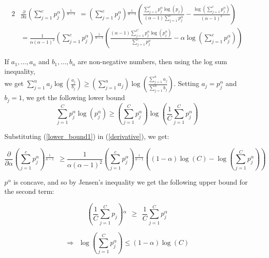 \documentclass[times,sort&compress]{elsarticle}
\begin{document}
\begin{alignat}{2} & \frac{\partial }{\partial \alpha} \left(\sum _{j=1}^c
p_j^{\alpha}\right){}^{\frac{1}{\alpha -1}}\ \ = \left(\sum _{j=1}^c
p_j^{\alpha}\right){}^{\frac{1}{\alpha -1}} \left(\frac{\sum _{j=1}^c p_j^{\alpha } \log
\left(p_j\right)}{(\alpha -1) \sum _{j=1}^c p_j^{\alpha}}-\frac{\log \left(\sum _{j=1}^c
p_j^{\alpha}\right)}{(\alpha -1)^2}\right) \\
& = \frac{1}{\alpha  (\alpha -1)^2} \left(\sum _{j=1}^c p_j^{\alpha
}\right){}^{\frac{1}{\alpha -1}} \left(\frac{(\alpha -1) \sum _{j=1}^C p_j^{\alpha }
\log \left(p_j^{\alpha}\right)}{\sum _{j=1}^c p_j^{\alpha }}-\alpha \log \left(\sum
_{j=1}^c p_j^{\alpha }\right)\right) \label{derivative} \end{alignat}

If $a_1,\dots ,a_n$ and $b_1,\dots ,b_n$ are non-negative numbers, then using the log
sum inequality, \\ we get $\sum _{j=1}^n a_j \log \left(\frac{a_j}{b_j}\right)\geq
\left(\sum _{j=1}^n a_j\right) \log \left(\frac{\sum _{j=1}^n a_j}{\sum _{j=1}^n
b_j}\right)$. Setting $a_j=p_j^\alpha$ and $b_j=1$, we get the following lower bound
\begin{equation} \sum _{j=1}^C p_j^{\alpha } \log
\left(p_j^{\alpha }\right)\geq \left(\sum _{j=1}^C
p_j^{\alpha}\right) \log \left(\frac{1}{C} \sum _{j=1}^C
p_j^{\alpha}\right) \label{lower_bound1} \end{equation}

Substituting (\ref{lower_bound1}) in (\ref{derivative}), we get:

\begin{equation} \frac{\partial }{\partial \alpha} \left(\sum
_{j=1}^c p_j^{\alpha}\right){}^{\frac{1}{\alpha -1}}\ \ \geq
\frac{1}{\alpha  (\alpha -1)^2} \left(\sum _{j=1}^c
p_j^{\alpha}\right){}^{\frac{1}{\alpha -1}} \left((1-\alpha )
\log (C)-\log \left(\sum _{j=1}^C p_j^{\alpha }\right)\right)
\label{lb_subs} \end{equation}

$p^{\alpha}$ is concave, and so by Jensen's inequality we get the following upper bound
for the second term:

\begin{equation} \left(\frac{1}{C}{\sum _{j=1}^C
p_j}{}\right){}^{\alpha }\ \ \geq\ \ \frac{1}{C}{\sum _{j=1}^C
p_j^{\alpha }}{} \end{equation}

\begin{equation}\Rightarrow\ \ \log \left(\sum _{j=1}^C p_j^{\alpha}\right)\leq
(1-\alpha ) \log (C) \label{upper_bound} \end{equation}
\end{document}
